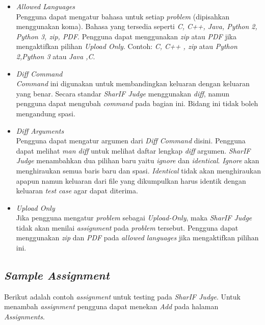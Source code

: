 \begin{itemize}
	\item \textit{Allowed Languages} \\
	Pengguna dapat mengatur bahasa untuk setiap \textit{problem} (dipisahkan menggunakan koma). Bahasa yang tersedia seperti \textit{C, C++, Java, Python 2, Python 3, zip, PDF}. Pengguna dapat menggunakan \textit{zip} atau \textit{PDF} jika mengaktifkan pilihan \textit{Upload Only}. Contoh: \textit{C, C++ , zip} atau \textit{Python 2,Python 3} atau \textit{Java ,C}.
	
	\item \textit{Diff Command} \\
	\textit{Command} ini digunakan untuk membandingkan keluaran dengan keluaran yang benar. Secara standar \textit{SharIF Judge} menggunakan \textit{diff}, namun pengguna dapat mengubah \textit{command} pada bagian ini. Bidang ini tidak boleh mengandung spasi.
	
	\item \textit{Diff Arguments} \\
	Pengguna dapat mengatur argumen dari \textit{Diff Command} disini. Pengguna dapat melihat \textit{man diff} untuk melihat daftar lengkap \textit{diff} argumen. \textit{SharIF Judge} menambahkan dua pilihan baru yaitu \textit{ignore} dan \textit{identical}. \textit{Ignore} akan menghiraukan semua baris baru dan spasi. \textit{Identical} tidak akan menghiraukan apapun namun keluaran dari file yang dikumpulkan harus identik dengan keluaran \textit{test case} agar dapat diterima.
	
	\item \textit{Upload Only} \\
	Jika pengguna mengatur \textit{problem} sebagai \textit{Upload-Only}, maka \textit{SharIF Judge} tidak akan menilai \textit{assignment} pada \textit{problem} tersebut. Pengguna dapat menggunakan \textit{zip} dan \textit{PDF} pada \textit{allowed languages} jika mengaktifkan pilihan ini.
	
\end{itemize}

\subsection{\textit{Sample Assignment}}
Berikut adalah contoh \textit{assignment} untuk testing pada \textit{SharIF Judge}. Untuk menambah \textit{assignment} pengguna dapat menekan \textit{Add} pada halaman \textit{Assignments}.

